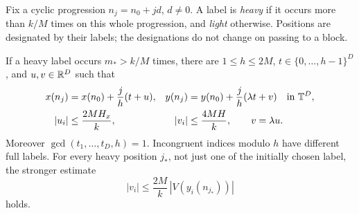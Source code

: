 Fix a cyclic progression \(n_j=n_0+jd\), \(d\ne0\).
A label is \emph{heavy} if it occurs more than \(k/M\) times on this
whole progression, and \emph{light} otherwise. Positions are
designated by their labels; the designations do not change on passing
to a block.

\begin{lemma}\label{lem:return}
If a heavy label occurs \(m_*>k/M\) times, there are
\(1\le h\le2M\), \(t\in\{0,\ldots,h-1\}^D\), and \(u,v\in\mathbb R^D\)
such that
\begin{align}
 x(n_j)&=x(n_0)+\frac jh(t+u),&
 y(n_j)&=y(n_0)+\frac jh(\lambda t+v)
 \quad\text{in }\mathbb T^D,\label{eq:return-path}\\
 |u_i|&\le\frac{2MH_x}{k},&
 |v_i|&\le\frac{4MH}{k},\qquad v=\lambda u.
 \label{eq:return-drift}
\end{align}
Moreover \(\gcd(t_1,\ldots,t_D,h)=1\).
Incongruent indices modulo \(h\) have different full labels.
For every heavy position \(j_*\), not just one of the initially chosen
label, the stronger estimate
\begin{equation}\label{eq:heavy-relative}
 |v_i|\le\frac{2M}{k}\,|V(y_i(n_{j_*}))|
\end{equation}
holds.
\end{lemma}

